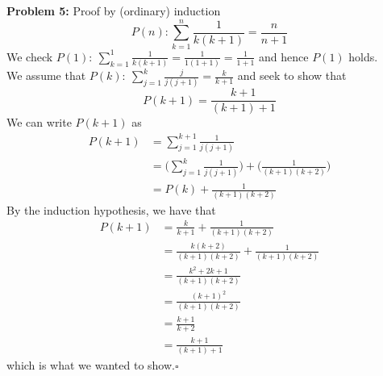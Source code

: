\documentclass[letterpaper]{article}
\begin{document}
\bigskip
\noindent \textbf{Problem 5:}
Proof by (ordinary) induction
    $$P(n):\sum \limits_{k=1}^{n} \frac{1}{k(k+1)} = \frac{n}{n+1}$$
We check $P(1):~\sum \limits_{k=1}^{1} \frac{1}{k(k+1)} = \frac{1}{1(1+1)} =\frac{1}{1+1}$ and hence
$P(1)$ holds. \\
We assume that $P(k):~\sum \limits_{j=1}^{k} \frac{j}{j(j+1)} = \frac{k}{k+1}$ and seek to show that
    $$P(k+1)=\frac{k+1}{(k+1)+1}$$
We can write $P(k+1)$ as
    $$\begin{aligned}
        P(k+1) &= \sum \limits_{j=1}^{k+1} \frac{1}{j(j+1)} \\
        &= \big(\sum \limits_{j=1}^{k} \frac{1}{j(j+1)}\big) + \big(\frac{1}{(k+1)(k+2)}\big) \\
        &= P(k)+\frac{1}{(k+1)(k+2)}
    \end{aligned}$$
By the induction hypothesis, we have that
    $$\begin{aligned}
        P(k+1) &= \frac{k}{k+1} + \frac{1}{(k+1)(k+2)} \\
        &= \frac{k(k+2)}{(k+1)(k+2)} + \frac{1}{(k+1)(k+2)} \\
        &= \frac{k^2+2k+1}{(k+1)(k+2)} \\
        &= \frac{(k+1)^2}{(k+1)(k+2)}\\
        &= \frac{k+1}{k+2} \\
        &= \frac{k+1}{(k+1)+1}
    \end{aligned}$$
which is what we wanted to show.\hfill $\square$
\end{document}

